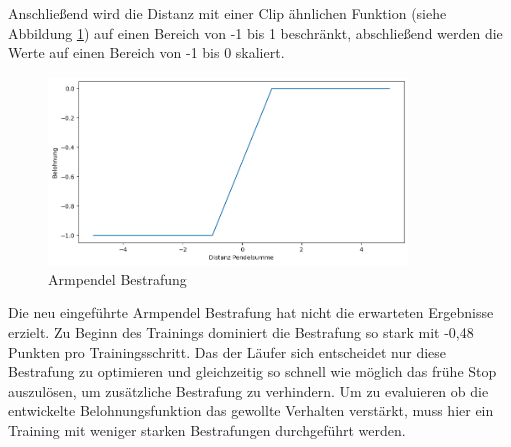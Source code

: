Anschließend wird die Distanz mit einer Clip ähnlichen Funktion (siehe Abbildung \ref{fig:plot_hand_pendel}) auf einen Bereich von -1 bis 1 beschränkt, abschließend werden die Werte auf einen Bereich von -1 bis 0 skaliert.

\begin{figure}[H]
  \centering  
  \includegraphics[width=0.85\textwidth]{img/plot_hand_pendel}
  \caption{Armpendel Bestrafung}
  \label{fig:plot_hand_pendel}
\end{figure}

Die neu eingeführte Armpendel Bestrafung hat nicht die erwarteten Ergebnisse erzielt. Zu Beginn des Trainings dominiert die Bestrafung so stark mit -0,48 Punkten pro Trainingsschritt. Das der Läufer sich entscheidet nur diese Bestrafung zu optimieren und gleichzeitig so schnell wie möglich das frühe Stop auszulösen, um zusätzliche Bestrafung zu verhindern. Um zu evaluieren ob die entwickelte Belohnungsfunktion das gewollte Verhalten verstärkt, muss hier ein Training mit weniger starken Bestrafungen durchgeführt werden.

